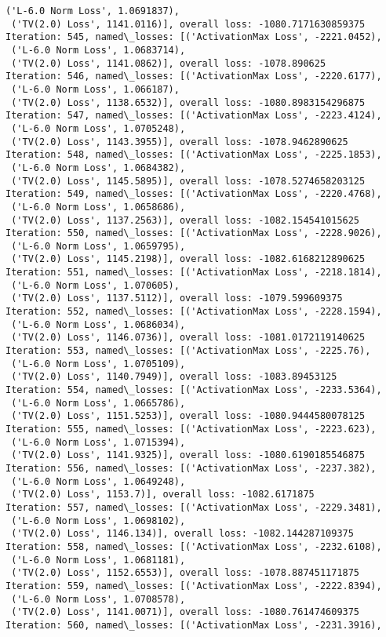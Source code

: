 \documentclass[10pt]{article}
\begin{document}
\begin{Verbatim}[commandchars=\\\{\}]
 ('L-6.0 Norm Loss', 1.0691837),
 ('TV(2.0) Loss', 1141.0116)], overall loss: -1080.7171630859375
Iteration: 545, named\_losses: [('ActivationMax Loss', -2221.0452),
 ('L-6.0 Norm Loss', 1.0683714),
 ('TV(2.0) Loss', 1141.0862)], overall loss: -1078.890625
Iteration: 546, named\_losses: [('ActivationMax Loss', -2220.6177),
 ('L-6.0 Norm Loss', 1.066187),
 ('TV(2.0) Loss', 1138.6532)], overall loss: -1080.8983154296875
Iteration: 547, named\_losses: [('ActivationMax Loss', -2223.4124),
 ('L-6.0 Norm Loss', 1.0705248),
 ('TV(2.0) Loss', 1143.3955)], overall loss: -1078.9462890625
Iteration: 548, named\_losses: [('ActivationMax Loss', -2225.1853),
 ('L-6.0 Norm Loss', 1.0684382),
 ('TV(2.0) Loss', 1145.5895)], overall loss: -1078.5274658203125
Iteration: 549, named\_losses: [('ActivationMax Loss', -2220.4768),
 ('L-6.0 Norm Loss', 1.0658686),
 ('TV(2.0) Loss', 1137.2563)], overall loss: -1082.154541015625
Iteration: 550, named\_losses: [('ActivationMax Loss', -2228.9026),
 ('L-6.0 Norm Loss', 1.0659795),
 ('TV(2.0) Loss', 1145.2198)], overall loss: -1082.6168212890625
Iteration: 551, named\_losses: [('ActivationMax Loss', -2218.1814),
 ('L-6.0 Norm Loss', 1.070605),
 ('TV(2.0) Loss', 1137.5112)], overall loss: -1079.599609375
Iteration: 552, named\_losses: [('ActivationMax Loss', -2228.1594),
 ('L-6.0 Norm Loss', 1.0686034),
 ('TV(2.0) Loss', 1146.0736)], overall loss: -1081.0172119140625
Iteration: 553, named\_losses: [('ActivationMax Loss', -2225.76),
 ('L-6.0 Norm Loss', 1.0705109),
 ('TV(2.0) Loss', 1140.7949)], overall loss: -1083.89453125
Iteration: 554, named\_losses: [('ActivationMax Loss', -2233.5364),
 ('L-6.0 Norm Loss', 1.0665786),
 ('TV(2.0) Loss', 1151.5253)], overall loss: -1080.9444580078125
Iteration: 555, named\_losses: [('ActivationMax Loss', -2223.623),
 ('L-6.0 Norm Loss', 1.0715394),
 ('TV(2.0) Loss', 1141.9325)], overall loss: -1080.6190185546875
Iteration: 556, named\_losses: [('ActivationMax Loss', -2237.382),
 ('L-6.0 Norm Loss', 1.0649248),
 ('TV(2.0) Loss', 1153.7)], overall loss: -1082.6171875
Iteration: 557, named\_losses: [('ActivationMax Loss', -2229.3481),
 ('L-6.0 Norm Loss', 1.0698102),
 ('TV(2.0) Loss', 1146.134)], overall loss: -1082.144287109375
Iteration: 558, named\_losses: [('ActivationMax Loss', -2232.6108),
 ('L-6.0 Norm Loss', 1.0681181),
 ('TV(2.0) Loss', 1152.6553)], overall loss: -1078.887451171875
Iteration: 559, named\_losses: [('ActivationMax Loss', -2222.8394),
 ('L-6.0 Norm Loss', 1.0708578),
 ('TV(2.0) Loss', 1141.0071)], overall loss: -1080.761474609375
Iteration: 560, named\_losses: [('ActivationMax Loss', -2231.3916),

\end{Verbatim}
\end{document}
